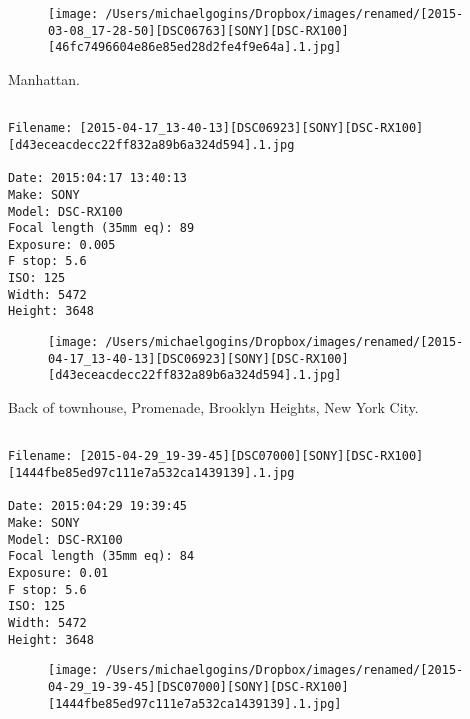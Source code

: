 \documentclass[11pt,letter,DIV=14,paper=landscape]{scrbook}
\begin{document}
\begin{figure}
\texttt{[image: /Users/michaelgogins/Dropbox/images/renamed/[2015-03-08\_17-28-50][DSC06763][SONY][DSC-RX100][46fc7496604e86e85ed28d2fe4f9e64a].1.jpg]}
\end{figure}
    
\clearpage
\noindent Manhattan.
\noindent
\begin{lstlisting}

Filename: [2015-04-17_13-40-13][DSC06923][SONY][DSC-RX100][d43eceacdecc22ff832a89b6a324d594].1.jpg

Date: 2015:04:17 13:40:13
Make: SONY
Model: DSC-RX100
Focal length (35mm eq): 89
Exposure: 0.005
F stop: 5.6
ISO: 125
Width: 5472
Height: 3648
\end{lstlisting}
\clearpage

\begin{figure}
\texttt{[image: /Users/michaelgogins/Dropbox/images/renamed/[2015-04-17\_13-40-13][DSC06923][SONY][DSC-RX100][d43eceacdecc22ff832a89b6a324d594].1.jpg]}
\end{figure}
    
\clearpage
\noindent Back of townhouse, Promenade, Brooklyn Heights, New York City.
\noindent
\begin{lstlisting}

Filename: [2015-04-29_19-39-45][DSC07000][SONY][DSC-RX100][1444fbe85ed97c111e7a532ca1439139].1.jpg

Date: 2015:04:29 19:39:45
Make: SONY
Model: DSC-RX100
Focal length (35mm eq): 84
Exposure: 0.01
F stop: 5.6
ISO: 125
Width: 5472
Height: 3648
\end{lstlisting}
\clearpage

\begin{figure}
\texttt{[image: /Users/michaelgogins/Dropbox/images/renamed/[2015-04-29\_19-39-45][DSC07000][SONY][DSC-RX100][1444fbe85ed97c111e7a532ca1439139].1.jpg]}
\end{figure}
    
\end{document}
